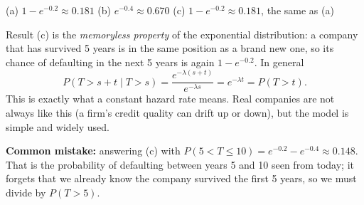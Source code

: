 \begin{solution}
	\begin{answer}
		(a) $1-e^{-0.2}\approx0.181$ \quad
		(b) $e^{-0.4}\approx0.670$ \quad
		(c) $1-e^{-0.2}\approx0.181$, the same as (a)
	\end{answer}
	\begin{remark}
		Result (c) is the \emph{memoryless property} of the exponential
		distribution: a company that has survived 5 years is in the same
		position as a brand new one, so its chance of defaulting in the next
		5 years is again $1-e^{-0.2}$. In general
		\[
			P(T>s+t\mid T>s)=\dfrac{e^{-\lambda(s+t)}}{e^{-\lambda s}}
			=e^{-\lambda t}=P(T>t).
		\]
		This is exactly what a constant hazard rate means. Real companies are
		not always like this (a firm's credit quality can drift up or down),
		but the model is simple and widely used.
	\end{remark}
	\begin{remark}
		\textbf{Common mistake:} answering (c) with $P(5<T\le10)=e^{-0.2}-e^{-0.4}
			\approx0.148$. That is the probability of defaulting between years
		5 and 10 seen from today; it forgets that we already know the company
		survived the first 5 years, so we must divide by $P(T>5)$.
	\end{remark}
\end{solution}
